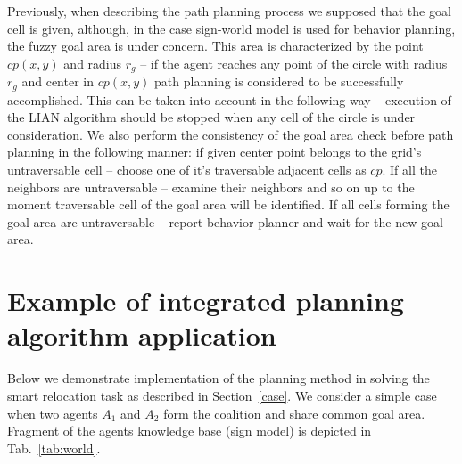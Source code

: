 \documentclass[runningheads,a4paper]{llncs}
\begin{document}
Previously, when describing the path planning process we supposed that the goal cell is given, although, in the case sign-world model is used for behavior planning, the fuzzy goal area is under concern. This area is characterized by the point $cp(x, y)$ and radius $r_g$ – if the agent reaches any point of the circle with radius $r_g$ and center in $cp(x, y)$ path planning is considered to be successfully accomplished. This can be taken into account in the following way – execution of the LIAN algorithm should be stopped when any cell of the circle is under consideration. We also perform the consistency of the goal area check before path planning in the following manner: if given center point belongs to the grid's untraversable cell – choose one of it's traversable adjacent cells as $cp$. If all the neighbors are untraversable – examine their neighbors and so on up to the moment traversable cell of the goal area will be identified. If all cells forming the goal area are untraversable – report  behavior planner and wait for the new goal area. 

\section{Example of integrated planning algorithm application}\label{example}

Below we demonstrate implementation of the planning method in solving the smart relocation task as described in Section~\ref{case}. We consider a simple case when two agents $A_1$ and $A_2$ form the coalition and share common goal area. Fragment of the agents knowledge base (sign model) is depicted in Tab.~\ref{tab:world}.
\end{document}
